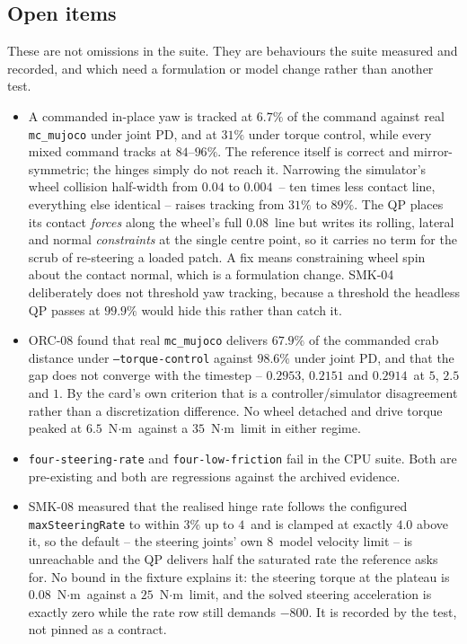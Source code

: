 \documentclass[10pt]{article}
\begin{document}
\subsection{Open items}
\label{sec:test-gaps-open}

These are not omissions in the suite. They are behaviours the suite measured and
recorded, and which need a formulation or model change rather than another test.

\begin{itemize}
  \item {} A commanded in-place yaw is tracked at
    $6.7\%$ of the command against real \texttt{mc\_mujoco} under joint PD, and
    at $31\%$ under torque control, while every mixed command tracks at
    $84$--$96\%$. The reference itself is correct and mirror-symmetric; the
    hinges simply do not reach it. Narrowing the simulator's wheel collision
    half-width from $0.04$ to $0.004$\unitMeter\ -- ten times less contact line,
    everything else identical -- raises tracking from $31\%$ to $89\%$. The QP
    places its contact \emph{forces} along the wheel's full $0.08$\unitMeter\
    line but writes its rolling, lateral and normal \emph{constraints} at the
    single centre point, so it carries no term for the scrub of re-steering a
    loaded patch. A fix means constraining wheel spin about the contact normal,
    which is a formulation change. SMK-04 deliberately does not threshold yaw
    tracking, because a threshold the headless QP passes at $99.9\%$ would hide
    this rather than catch it.
  \item {} ORC-08 found that real
    \texttt{mc\_mujoco} delivers $67.9\%$ of the commanded crab distance under
    \texttt{--torque-control} against $98.6\%$ under joint PD, and that the gap
    does not converge with the timestep -- $0.2953$, $0.2151$ and
    $0.2914$\unitMeter\ at $5$, $2.5$ and $1$\unitMs. By the card's own
    criterion that is a controller/simulator disagreement rather than a
    discretization difference. No wheel detached and drive torque peaked at
    $6.5$~N$\cdot$m\xspace\ against a $35$~N$\cdot$m\xspace\ limit in either regime.
  \item \tBlock{Two failing MuJoCo cases.} \texttt{four-steering-rate} and
    \texttt{four-low-friction} fail in the CPU suite. Both are pre-existing and
    both are regressions against the archived evidence.
  \item {} SMK-08 measured
    that the realised hinge rate follows the configured
    \texttt{maxSteeringRate} to within $3\%$ up to $4$\unitVelJS\ and is
    clamped at exactly $4.0$ above it, so the default -- the steering joints'
    own $8$\unitVelJS\ model velocity limit -- is unreachable and the QP
    delivers half the saturated rate the reference asks for. No bound in the
    fixture explains it: the steering torque at the plateau is
    $0.08$~N$\cdot$m\xspace\ against a $25$~N$\cdot$m\xspace\ limit, and the solved steering
    acceleration is exactly zero while the rate row still demands
    $-800$\unitAccVel. It is recorded by the test, not pinned as a contract.
\end{itemize}



\end{document}
